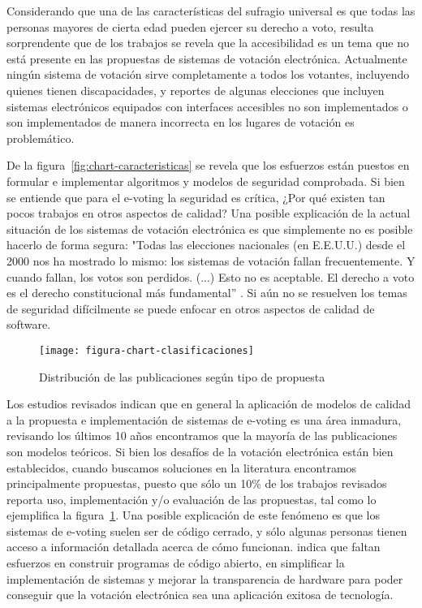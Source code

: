 Considerando que una de las características del sufragio universal es que todas las 
personas mayores de cierta edad pueden ejercer su derecho a voto, resulta sorprendente
que de los trabajos se revela que la accesibilidad es un tema que no está presente
en las propuestas de sistemas de votación electrónica. Actualmente ningún sistema de 
votación sirve completamente a todos los votantes, incluyendo quienes tienen 
discapacidades, y reportes de algunas elecciones 
que incluyen sistemas electrónicos equipados con interfaces accesibles no son
implementados o son implementados de manera incorrecta en los lugares de votación
es problemático. \cite{Goodman2012}

De la figura~\ref{fig:chart-caracteristicas} se revela que los esfuerzos están 
puestos en formular e implementar algoritmos y modelos de seguridad comprobada. Si bien
se entiende que para el e-voting la seguridad es crítica, ¿Por qué existen tan pocos trabajos en 
otros aspectos de calidad? Una posible explicación de la actual situación de los sistemas de votación electrónica
es que simplemente no es posible hacerlo de forma segura: "Todas las elecciones
nacionales (en E.E.U.U.) desde el 2000 nos ha mostrado lo mismo: los sistemas de votación 
fallan frecuentemente. Y cuando fallan, los votos son perdidos. (...) Esto no es aceptable. El 
derecho a voto es el derecho constitucional más fundamental'' \cite{Goodman2012}. Si aún
no se resuelven los temas de seguridad difícilmente se puede enfocar en otros aspectos
de calidad de software.

\begin{figure}[h!]
	\centering
	\texttt{[image: figura-chart-clasificaciones]}
	\caption{Distribución de las publicaciones según tipo de propuesta}
	\label{fig:chart-clasificaciones}
\end{figure}
\bigskip

Los estudios revisados indican que en general la aplicación de modelos de calidad a la propuesta
e implementación de sistemas de e-voting es una área inmadura, revisando los últimos 10 años
encontramos que la mayoría de las publicaciones son modelos teóricos. Si bien los desafíos de
la votación electrónica están bien establecidos, cuando buscamos soluciones en la literatura
encontramos principalmente propuestas, puesto que sólo un 10\% de los trabajos revisados 
reporta uso, implementación y/o evaluación de las propuestas, tal como lo ejemplifica 
la figura~\ref{fig:chart-clasificaciones}. Una posible explicación de este fenómeno es
que los sistemas de e-voting suelen ser de código cerrado, y sólo algunas personas tienen acceso
a información detallada acerca de cómo funcionan.  \cite{Benoist2007} indica que
faltan esfuerzos en construir programas de código abierto, en simplificar la implementación 
de sistemas y mejorar la transparencia de hardware para poder conseguir que la votación 
electrónica sea una aplicación exitosa de tecnología.

